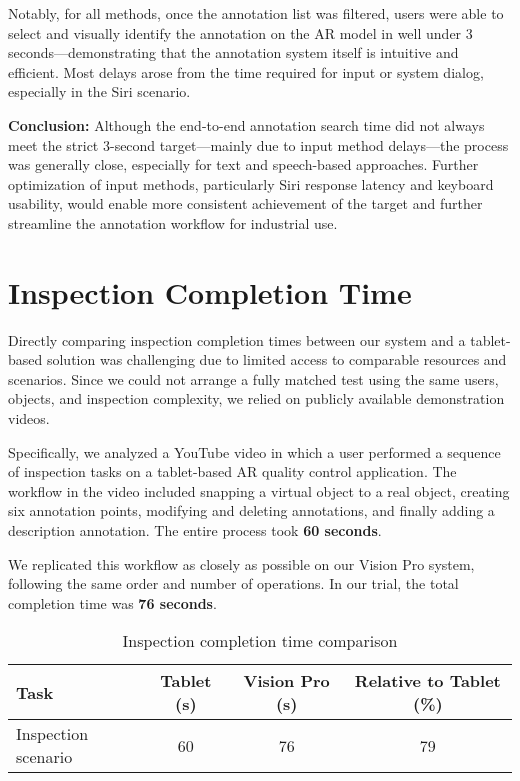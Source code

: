 Notably, for all methods, once the annotation list was filtered, users were able to select and visually identify the annotation on the AR model in well under 3 seconds—demonstrating that the annotation system itself is intuitive and efficient. Most delays arose from the time required for input or system dialog, especially in the Siri scenario.

\vspace{1em}
\noindent
\textbf{Conclusion:} Although the end-to-end annotation search time did not always meet the strict 3-second target—mainly due to input method delays—the process was generally close, especially for text and speech-based approaches. Further optimization of input methods, particularly Siri response latency and keyboard usability, would enable more consistent achievement of the target and further streamline the annotation workflow for industrial use.


\section{Inspection Completion Time}

Directly comparing inspection completion times between our system and a tablet-based solution was challenging due to limited access to comparable resources and scenarios. Since we could not arrange a fully matched test using the same users, objects, and inspection complexity, we relied on publicly available demonstration videos.

Specifically, we analyzed a YouTube video in which a user performed a sequence of inspection tasks on a tablet-based AR quality control application. The workflow in the video included snapping a virtual object to a real object, creating six annotation points, modifying and deleting annotations, and finally adding a description annotation. The entire process took \textbf{60 seconds}.

We replicated this workflow as closely as possible on our Vision Pro system, following the same order and number of operations. In our trial, the total completion time was \textbf{76 seconds}.

\begin{table}[h!]
    \centering
    \caption{Inspection completion time comparison}
    \label{tab:inspection_completion_time}
    \begin{tabular}{|l|c|c|c|}
        \hline
        \textbf{Task} & \textbf{Tablet (s)} & \textbf{Vision Pro (s)} & \textbf{Relative to Tablet (\%)} \\
        \hline
        Inspection scenario & 60 & 76 & 79 \\
        \hline
    \end{tabular}
\end{table}


